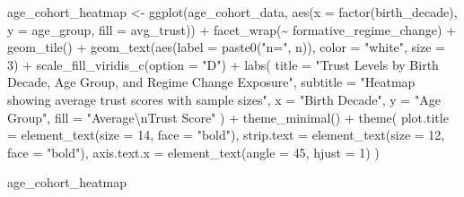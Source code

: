 \documentclass[
  letterpaper,
  DIV=11,
  numbers=noendperiod]{scrartcl}
\newenvironment{Shaded}{\begin{snugshade}}{\end{snugshade}}
\newcommand{\AttributeTok}[1]{\textcolor[rgb]{0.40,0.45,0.13}{#1}}
\newcommand{\DecValTok}[1]{\textcolor[rgb]{0.68,0.00,0.00}{#1}}
\newcommand{\FunctionTok}[1]{\textcolor[rgb]{0.28,0.35,0.67}{#1}}
\newcommand{\NormalTok}[1]{\textcolor[rgb]{0.00,0.23,0.31}{#1}}
\newcommand{\OtherTok}[1]{\textcolor[rgb]{0.00,0.23,0.31}{#1}}
\newcommand{\SpecialCharTok}[1]{\textcolor[rgb]{0.37,0.37,0.37}{#1}}
\newcommand{\StringTok}[1]{\textcolor[rgb]{0.13,0.47,0.30}{#1}}
\begin{document}
\begin{Shaded}
\begin{Highlighting}[]
\NormalTok{age\_cohort\_heatmap }\OtherTok{\textless{}{-}} \FunctionTok{ggplot}\NormalTok{(age\_cohort\_data, }
                           \FunctionTok{aes}\NormalTok{(}\AttributeTok{x =} \FunctionTok{factor}\NormalTok{(birth\_decade), }\AttributeTok{y =}\NormalTok{ age\_group, }\AttributeTok{fill =}\NormalTok{ avg\_trust)) }\SpecialCharTok{+}
  \FunctionTok{facet\_wrap}\NormalTok{(}\SpecialCharTok{\textasciitilde{}}\NormalTok{ formative\_regime\_change) }\SpecialCharTok{+}
  \FunctionTok{geom\_tile}\NormalTok{() }\SpecialCharTok{+}
  \FunctionTok{geom\_text}\NormalTok{(}\FunctionTok{aes}\NormalTok{(}\AttributeTok{label =} \FunctionTok{paste0}\NormalTok{(}\StringTok{"n="}\NormalTok{, n)), }
            \AttributeTok{color =} \StringTok{"white"}\NormalTok{, }\AttributeTok{size =} \DecValTok{3}\NormalTok{) }\SpecialCharTok{+}
  \FunctionTok{scale\_fill\_viridis\_c}\NormalTok{(}\AttributeTok{option =} \StringTok{"D"}\NormalTok{) }\SpecialCharTok{+}
  \FunctionTok{labs}\NormalTok{(}
    \AttributeTok{title =} \StringTok{"Trust Levels by Birth Decade, Age Group, and Regime Change Exposure"}\NormalTok{,}
    \AttributeTok{subtitle =} \StringTok{"Heatmap showing average trust scores with sample sizes"}\NormalTok{,}
    \AttributeTok{x =} \StringTok{"Birth Decade"}\NormalTok{,}
    \AttributeTok{y =} \StringTok{"Age Group"}\NormalTok{,}
    \AttributeTok{fill =} \StringTok{"Average}\SpecialCharTok{\textbackslash{}n}\StringTok{Trust Score"}
\NormalTok{  ) }\SpecialCharTok{+}
  \FunctionTok{theme\_minimal}\NormalTok{() }\SpecialCharTok{+}
  \FunctionTok{theme}\NormalTok{(}
    \AttributeTok{plot.title =} \FunctionTok{element\_text}\NormalTok{(}\AttributeTok{size =} \DecValTok{14}\NormalTok{, }\AttributeTok{face =} \StringTok{"bold"}\NormalTok{),}
    \AttributeTok{strip.text =} \FunctionTok{element\_text}\NormalTok{(}\AttributeTok{size =} \DecValTok{12}\NormalTok{, }\AttributeTok{face =} \StringTok{"bold"}\NormalTok{),}
    \AttributeTok{axis.text.x =} \FunctionTok{element\_text}\NormalTok{(}\AttributeTok{angle =} \DecValTok{45}\NormalTok{, }\AttributeTok{hjust =} \DecValTok{1}\NormalTok{)}
\NormalTok{  )}

\NormalTok{age\_cohort\_heatmap}
\end{Highlighting}
\end{Shaded}
\end{document}
